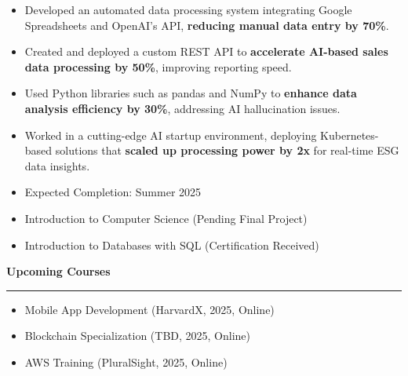 \documentclass[10pt,a4paper,ragged2e,withhyper]{altacv}
\newcommand{\smallcvsection}[1]{\textbf{\footnotesize #1}\vspace{3pt} \hrule \vspace{6pt}}
\begin{document}
\begin{paracol}{2}
\begin{itemize}
  \item Developed an automated data processing system integrating Google Spreadsheets and OpenAI’s API, \textbf{reducing manual data entry by 70\%}.  
  \item Created and deployed a custom REST API to \textbf{accelerate AI-based sales data processing by 50\%}, improving reporting speed.  
  \item Used Python libraries such as pandas and NumPy to \textbf{enhance data analysis efficiency by 30\%}, addressing AI hallucination issues.  
  \item Worked in a cutting-edge AI startup environment, deploying Kubernetes-based solutions that \textbf{scaled up processing power by 2x} for real-time ESG data insights.  
\end{itemize}


\begin{itemize}
  \item Expected Completion: Summer 2025
\end{itemize}
\begin{itemize}
  \item Introduction to Computer Science      (Pending Final Project)
  \item Introduction to Databases with SQL    (Certification Received)
\end{itemize}

\vspace{16pt} %
\smallcvsection{Upcoming Courses} %

\begin{itemize}
  \item {\footnotesize Mobile App Development (HarvardX, 2025, Online)}
  \item {\footnotesize Blockchain Specialization (TBD, 2025, Online)}
  \item {\footnotesize AWS Training (PluralSight, 2025, Online)}
\end{itemize}

\end{paracol}
\end{document}
